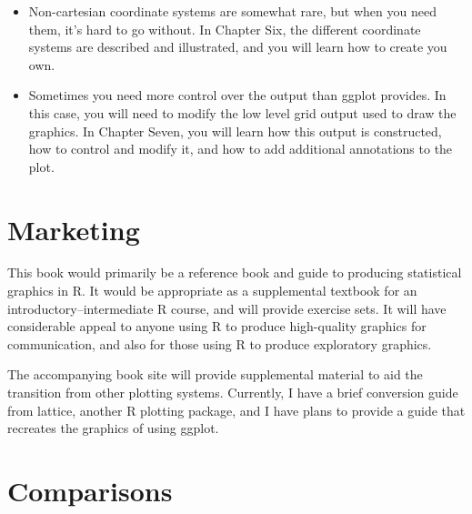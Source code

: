 \documentclass[oneside,letterpaper]{scrartcl}
\begin{document}
\begin{itemize}
	\item Non-cartesian coordinate systems are somewhat rare, but when you need them, it's hard to go without.  In Chapter Six, the different coordinate systems are described and illustrated, and you will learn how to create you own.
	
	\item Sometimes you need more control over the output than ggplot provides.  In this case, you will need to modify the low level grid output used to draw the graphics.  In Chapter Seven, you will learn how this output is constructed, how to control and modify it, and how to add additional annotations to the plot.

\end{itemize}


\section{Marketing}\label{sec:marketing} 


This book would primarily be a reference book and guide to producing statistical graphics in R.  It would be appropriate as a supplemental textbook for an introductory--intermediate R course, and will provide exercise sets.  It will have considerable appeal to anyone using R to produce high-quality graphics for communication, and also for those using R to produce exploratory graphics.  

The accompanying book site will provide supplemental material to aid the transition from other plotting systems.  Currently, I have a brief conversion guide from lattice, another R plotting package, and I have plans to provide a guide that recreates the graphics of \citet{wilkinson:2006} using ggplot.

\section{Comparisons}\label{sec:comparisons} 
\end{document}
